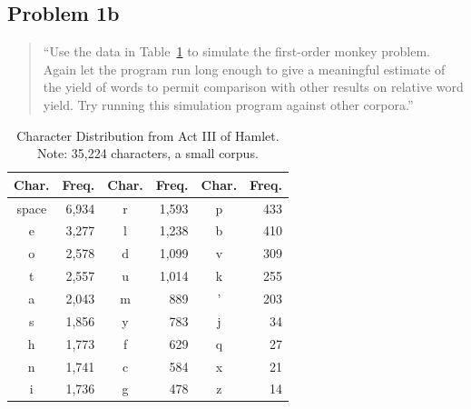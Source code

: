 \documentclass[conference]{IEEEtran}
\newcommand{\codefile}[1]{
  \begin{framed}
  \fontsize{5.65}{6.78}\selectfont
  
  \end{framed}
}
\begin{document}
\subsection{Problem 1b}
\label{sec:problem1b}

\begin{quote}
``Use the data in Table~\ref{tab:hamlet} to simulate the first-order monkey problem. 
Again let the program run long enough to give a meaningful estimate of the yield 
of words to permit comparison with other results on relative word yield. Try running
this simulation program against other corpora.''
\end{quote}

\begin{table}
\caption{\hspace{2em}Character Distribution from Act III of Hamlet. \newline
Note: 35,224 characters, a small corpus.\label{tab:hamlet}}
\vspace{-10pt}
\begin{center}
\begin{tabular}{crcrcr}
\hline
Char. & Freq. & Char. & Freq. & Char. & Freq. \\
\hline
space & 6,934  & r     & 1,593  & p     & 433   \\
e     & 3,277  & l     & 1,238  & b     & 410   \\
o     & 2,578  & d     & 1,099  & v     & 309   \\
t     & 2,557  & u     & 1,014  & k     & 255   \\
a     & 2,043  & m     & 889   & '     & 203   \\
s     & 1,856  & y     & 783   & j     & 34    \\
h     & 1,773  & f     & 629   & q     & 27    \\
n     & 1,741  & c     & 584   & x     & 21    \\
i     & 1,736  & g     & 478   & z     & 14    \\
\hline
\end{tabular}
\end{center}
\end{table}

\codefile{problem1b.py}
\end{document}
